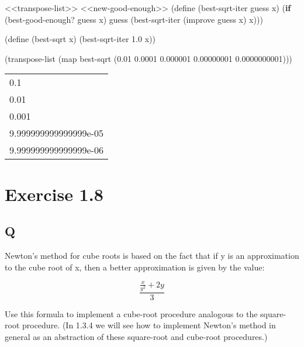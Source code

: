 \documentclass[
]{article}
\newenvironment{Shaded}{}{}
\newcommand{\ExtensionTok}[1]{#1}
\newcommand{\FloatTok}[1]{\textcolor[rgb]{0.25,0.63,0.44}{#1}}
\newcommand{\FunctionTok}[1]{\textcolor[rgb]{0.02,0.16,0.49}{#1}}
\newcommand{\KeywordTok}[1]{\textcolor[rgb]{0.00,0.44,0.13}{\textbf{#1}}}
\newcommand{\NormalTok}[1]{#1}
\begin{document}
\hypertarget{EX1-7-t3}{%
\label{EX1-7-t3}}%
\begin{Shaded}
\begin{Highlighting}[]
\NormalTok{\textless{}\textless{}transpose{-}list\textgreater{}\textgreater{}}
\NormalTok{\textless{}\textless{}new{-}good{-}enough\textgreater{}\textgreater{}}
\NormalTok{(}\ExtensionTok{define}\FunctionTok{ }\NormalTok{(best{-}sqrt{-}iter guess x)}
\NormalTok{  (}\KeywordTok{if}\NormalTok{ (best{-}good{-}enough? guess x)}
\NormalTok{      guess}
\NormalTok{      (best{-}sqrt{-}iter (improve guess x) x)))}

\NormalTok{(}\ExtensionTok{define}\FunctionTok{ }\NormalTok{(best{-}sqrt x)}
\NormalTok{  (best{-}sqrt{-}iter }\FloatTok{1.0}\NormalTok{ x))}

\NormalTok{(transpose{-}list (map best{-}sqrt \textquotesingle{}(}\FloatTok{0.01} \FloatTok{0.0001} \FloatTok{0.000001} \FloatTok{0.00000001} \FloatTok{0.0000000001}\NormalTok{)))}
\end{Highlighting}
\end{Shaded}

\begin{longtable}[]{@{}l@{}}
\toprule
\endhead
0.1 \\
0.01 \\
0.001 \\
9.999999999999999e-05 \\
9.999999999999999e-06 \\
\bottomrule
\end{longtable}

\hypertarget{exercise-1.8}{%
\section{Exercise 1.8}\label{exercise-1.8}}

\hypertarget{q-7}{%
\subsection{Q}\label{q-7}}

Newton's method for cube roots is based on the fact that if y is an
approximation to the cube root of x, then a better approximation is
given by the value:

\begin{equation}
\frac{\frac{x}{y^2} + 2y}{3}
\end{equation}

Use this formula to implement a cube-root procedure analogous to the
square-root procedure. (In 1.3.4 we will see how to implement Newton's
method in general as an abstraction of these square-root and cube-root
procedures.)
\end{document}
